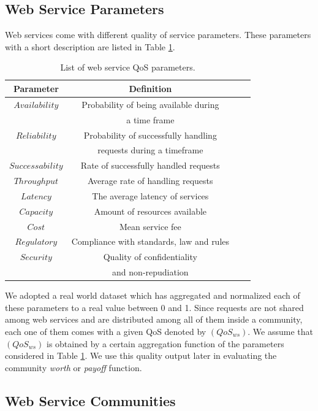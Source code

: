 \documentclass[10pt,journal,cspaper,compsoc]{IEEEtran}
\begin{document}
\subsection{Web Service Parameters}\label{ws_parameters}

Web services come with different quality of service parameters.
These parameters with a short description are listed in Table
\ref{qosws}.

\begin{table}[!t]
\centering
\caption{List of web service QoS parameters.}
\begin{tabular}{|c|c||c|c|}
\hline
\textbf{Parameter} & \textbf{Definition} \\
\hline\hline
$Availability$ & Probability of being available during \\
&a time frame \\
$Reliability$ & Probability of successfully handling \\
&requests during a timeframe\\
$Successability$ & Rate of successfully handled requests \\
$Throughput$ & Average rate of handling requests \\
$Latency$ & The average latency of services\\
$Capacity$ & Amount of resources available\\
$Cost$ & Mean service fee \\
$Regulatory$ & Compliance with standards, law and rules\\
$Security$ & Quality of confidentiality \\
&and non-repudiation\\
\hline
\end{tabular}
\label{qosws}
\end{table}

We adopted a real world dataset \cite{DBLP:conf/smc/Al-MasriM09a}
which has aggregated and normalized each of these parameters to a
real value between 0 and 1. Since requests are not shared among
web services and are distributed among all of them inside a
community, each one of them comes with a given QoS denoted by
$(QoS_{ws})$. We assume that $(QoS_{ws})$ is obtained by a certain
aggregation function of the parameters considered in Table
\ref{qosws}. We use this quality output later in evaluating the
community \emph{worth} or \emph{payoff} function.

\subsection{Web Service Communities}\label{webservice-communities}
\end{document}
